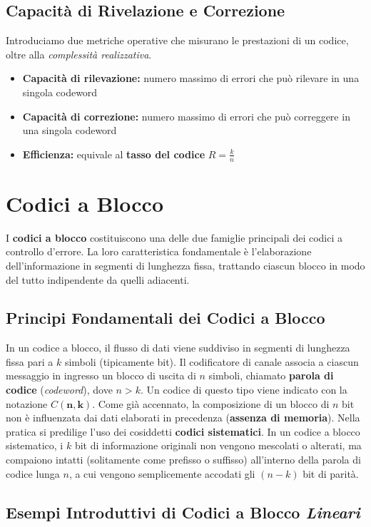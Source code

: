 \section{Capacità di Rivelazione e Correzione}
Introduciamo due metriche operative che misurano le prestazioni di un codice, oltre alla \textit{complessità realizzativa}.
\begin{itemize}
    \item{\textbf{Capacità di rilevazione:}} numero massimo di errori che può rilevare in una singola codeword 
    \item{\textbf{Capacità di correzione:}} numero massimo di errori che può correggere in una singola codeword
    \item{\textbf{Efficienza:}} equivale al \textbf{tasso del codice} $R=\frac{k}{n}$
\end{itemize}


\chapter{Codici a Blocco}
I \textbf{codici a blocco} costituiscono una delle due famiglie principali dei codici a controllo d'errore. La loro caratteristica fondamentale è l'elaborazione dell'informazione in segmenti di lunghezza fissa, trattando ciascun blocco in modo del tutto indipendente da quelli adiacenti.

\section{Principi Fondamentali dei Codici a Blocco}
In un codice a blocco, il flusso di dati viene suddiviso in segmenti di lunghezza fissa pari a $k$ simboli (tipicamente bit). Il codificatore di canale associa a ciascun messaggio in ingresso un blocco di uscita di $n$ simboli, chiamato \textbf{parola di codice} (\textit{codeword}), dove $n > k$. Un codice di questo tipo viene indicato con la notazione $C\mathbf{(n, k)}$.
Come già accennato, la composizione di un blocco di $n$ bit non è influenzata dai dati elaborati in precedenza (\textbf{assenza di memoria}).
Nella pratica si predilige l'uso dei cosiddetti \textbf{codici sistematici}. In un codice a blocco sistematico, i $k$ bit di informazione originali non vengono mescolati o alterati, ma compaiono intatti (solitamente come prefisso o suffisso) all'interno della parola di codice lunga $n$, a cui vengono semplicemente accodati gli $(n-k)$ bit di parità.

\section{Esempi Introduttivi di Codici a Blocco \textit{Lineari}}

